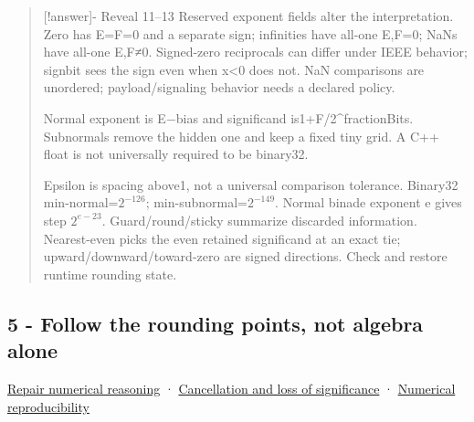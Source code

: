 \begin{quote}
{[}!answer{]}- Reveal 11--13 Reserved exponent fields alter the interpretation. Zero has E=F=0 and a separate sign; infinities have all-one E,F=0; NaNs have all-one E,F≠0. Signed-zero reciprocals can differ under IEEE behavior; signbit sees the sign even when x\textless0 does not. NaN comparisons are unordered; payload/signaling behavior needs a declared policy.

Normal exponent is E−bias and significand is1+F/2\^{}fractionBits. Subnormals remove the hidden one and keep a fixed tiny grid. A C++ float is not universally required to be binary32.

Epsilon is spacing above1, not a universal comparison tolerance. Binary32 min-normal=\(2^{-126}\); min-subnormal=\(2^{-149}\). Normal binade exponent e gives step \(2^{e-23}\). Guard/round/sticky summarize discarded information. Nearest-even picks the even retained significand at an exact tie; upward/downward/toward-zero are signed directions. Check and restore runtime rounding state.
\end{quote}

\subsection{5 - Follow the rounding points, not algebra alone}\label{appendix-ef4d27797a92-follow-the-rounding-points-not-algebra-alone}

\hypertarget{appendix-ef4d27797a92-follow-the-rounding-points-not-algebra-alone}{}

\hyperref[01-foundations-i-ch001-when-arithmetic-meets-uncertainty]{Repair numerical reasoning} · \hyperref[appendix-a2773a6a2f9d]{Cancellation and loss of significance} · \hyperref[appendix-5f1a2c3f97ff]{Numerical reproducibility}


